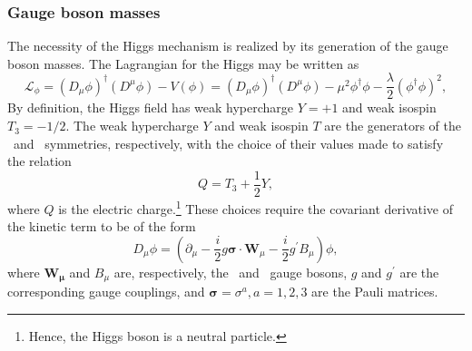 \subsubsection{Gauge boson masses}

The necessity of the Higgs mechanism is realized by its generation of the gauge boson masses. The Lagrangian for the Higgs may be written as
\begin{equation}
  \mathcal{L}_{\phi} = (D_{\mu}\phi)^{\dag}(D^{\mu}\phi) - V(\phi) = (D_{\mu}\phi)^{\dag}(D^{\mu}\phi) - \mu^{2}\phi^{\dag}\phi - \frac{\lambda}{2}(\phi^{\dag}\phi)^{2},
  \label{eq:Lhiggs}
\end{equation}
By definition, the Higgs field has weak hypercharge $Y = +1$ and weak isospin $T_{3} = -1/2$. The weak hypercharge $Y$ and weak isospin $T$ are the generators of the \symWEAK\ and \symEM\ symmetries, respectively, with the choice of their values made to satisfy the relation
\begin{equation}
  Q = T_{3} + \frac{1}{2}Y,
\end{equation}
where $Q$ is the electric charge.\footnote{Hence, the Higgs boson is a neutral particle.} These choices require the covariant derivative of the kinetic term to be of the form
\begin{equation}
  D_{\mu}\phi = (\partial_{\mu} - \frac{i}{2}g\boldsymbol\sigma\cdot\mathbf{W}_{\mu} - \frac{i}{2}g^{\prime}B_{\mu})\phi,
\end{equation}
where $\mathbf{W_{\mu}}$ and $B_{\mu}$ are, respectively, the \symWEAK\ and \symEM\ gauge bosons, $g$ and $g^{\prime}$ are the corresponding gauge couplings, and $\boldsymbol\sigma = \sigma^{a}, a = 1, 2, 3$ are the Pauli matrices.

